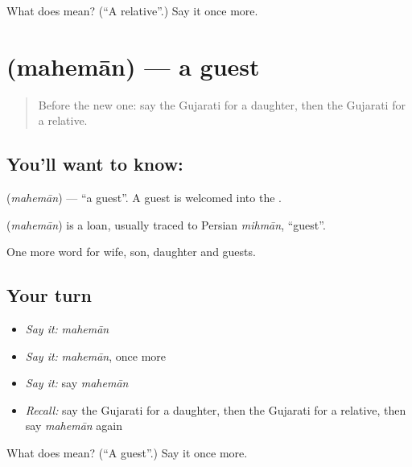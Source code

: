 \begin{tcolorbox}[breakable,colback=teal!4,colframe=teal!35!black,title={Before you move on}]
What does  mean? (\textquotedblleft{}A relative\textquotedblright{}.) Say it once more.
\end{tcolorbox}
\section[\texorpdfstring{\gu{મહેમાન} (mahemān)}{મહેમાન (mahemān)}]{ (mahemān) — a guest}

\label{lesson:GU-C53-guest}



\begin{quote}
Before the new one: say the Gujarati for a daughter, then the Gujarati for a relative.
\end{quote}

\subsection*{You'll want to know: }
\textbf{} (\emph{mahemān}) — \textquotedblleft{}a guest\textquotedblright{}. A guest is welcomed into the \textbf{}.

\begin{cousinweb}
\textbf{} (\emph{mahemān}) is a loan, usually traced to Persian \emph{mihmān}, \textquotedblleft{}guest\textquotedblright{}.
\end{cousinweb}

\begin{grammarlens}[title={What you've built}]
One more word for wife, son, daughter and guests.
\end{grammarlens}

\subsection*{Your turn}
\begin{itemize}
\raggedright
  \item \emph{Say it:} \emph{mahemān}
  \item \emph{Say it:} \emph{mahemān}, once more
  \item \emph{Say it:} say \emph{mahemān}
  \item \emph{Recall:} say the Gujarati for a daughter, then the Gujarati for a relative, then say \emph{mahemān} again
\end{itemize}

\begin{tcolorbox}[breakable,colback=teal!4,colframe=teal!35!black,title={Before you move on}]
What does  mean? (\textquotedblleft{}A guest\textquotedblright{}.) Say it once more.
\end{tcolorbox}
